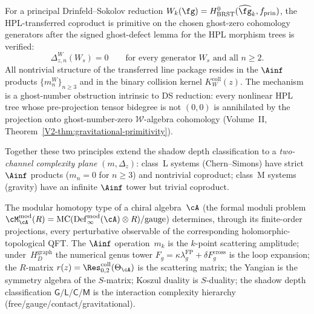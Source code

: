 \begin{principle}
\label{princ:gravitational-primitivity}
For a principal Drinfeld--Sokolov reduction
$W_k(\fg) = H^0_{\mathrm{BRST}}(\widehat{\fg}_k, f_{\mathrm{prin}})$,
the HPL-transferred coproduct is primitive on the chosen ghost-zero
cohomology generators after the signed ghost-defect lemma for the HPL
morphism trees is verified:
\[
\Delta_{z,n}^W(W_s) = 0
\qquad \text{for every generator }W_s\text{ and all } n \ge 2.
\]
All nontrivial structure of the transferred line package
resides in the $\Ainf$ products $\{m_n^W\}_{n \ge 3}$ and in
the binary collision kernel $K_W^{\mathrm{coll}}(z)$. The mechanism is a ghost-number
obstruction intrinsic to DS reduction: every nonlinear HPL tree whose
pre-projection tensor bidegree is not \((0,0)\) is annihilated by the
projection onto ghost-number-zero $\mathcal{W}$-algebra cohomology
\textup{(}Volume~II,
Theorem~\textup{\ref*{V2-thm:gravitational-primitivity}}\textup{)}.
\end{principle}

\noindent
Together these two principles extend the shadow depth classification
to a \emph{two-channel complexity plane} $(m, \Delta_z)$: class~L
systems (Chern--Simons) have strict $\Ainf$ products
($m_n = 0$ for $n \geq 3$) and nontrivial coproduct;
class~M systems (gravity) have an infinite $\Ainf$ tower but
trivial coproduct.

\begin{principle}
\label{princ:physics-is-homotopy-type}
The modular homotopy type of a chiral algebra~$\cA$
\textup{(}the formal
moduli problem
$\cM^{\mathrm{mod}}_\cA(R)
= \mathrm{MC}(\mathrm{Def}^{\mathrm{mod}}_\infty(\cA) \otimes R)/\mathrm{gauge}$\textup{)}
determines, through its finite-order projections, every
perturbative observable of the corresponding
holomorphic-topological QFT\@.
The $\Ainf$ operation~$m_k$ is the $k$-point scattering
amplitude; under~$H_D^{\mathrm{graph}}$ the numerical genus tower
$F_g=\kappa\lambda_g^{\mathrm{FP}}+\delta F_g^{\mathrm{cross}}$ is
the loop expansion; the $R$-matrix
$r(z) = \Res^{\mathrm{coll}}_{0,2}(\Theta_\cA)$ is the
scattering matrix; the Yangian is the symmetry algebra of the
$S$-matrix; Koszul duality is $S$-duality; the shadow depth
classification $\mathsf{G}/\mathsf{L}/\mathsf{C}/\mathsf{M}$ is
the interaction complexity hierarchy
\textup{(}free/gauge/contact/gravitational\textup{)}.
\end{principle}

